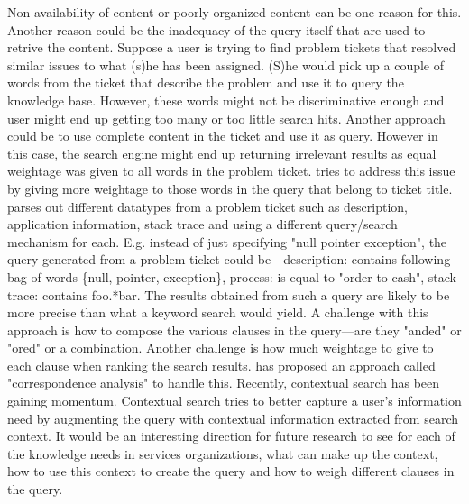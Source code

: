 Non-availability of content or poorly organized content can be one reason for this. Another reason could be the inadequacy of the query itself that are used to retrive the content. Suppose a user is trying to find problem tickets that resolved similar issues to what (s)he has been assigned. (S)he would pick up a couple of words from the ticket that describe the problem and use it to query the knowledge base. However, these words might not be discriminative enough and user might end up getting too many or too little search hits. Another approach could be to use complete content in the ticket and use it as query. However in this case, the search engine might end up returning irrelevant results as equal weightage was given to all words in the problem ticket. \cite{} tries to address this issue by giving more weightage to those words in the query that belong to ticket title. \cite{} parses out different datatypes from a problem ticket such as description, application information, stack trace and using a different query/search mechanism for each. E.g. instead of just specifying "null pointer exception", the query generated from a problem ticket could be---description: contains following bag of words \{null, pointer, exception\}, process: is equal to "order to cash", stack trace: contains foo.*bar. The results obtained from such a query are likely to be more precise than what a keyword search would yield. A challenge with this approach is how to compose the various clauses in the query---are they "anded" or "ored" or a combination. Another challenge is how much weightage to give to each clause when ranking the search results. \cite{} has proposed an approach called "correspondence analysis" to handle this. Recently, contextual search \cite{} has been gaining momentum. Contextual search tries to better capture a user's information need by augmenting the query with contextual information extracted from search context. It would be an interesting direction for future research to see for each of the knowledge needs in services organizations, what can make up the context, how to use this context to create the query and how to weigh different clauses in the query. 

